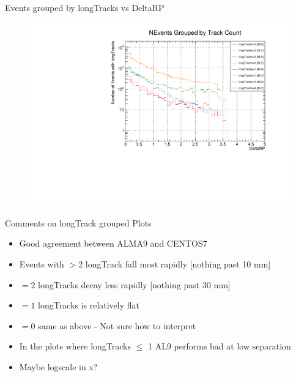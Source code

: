 \begin{frame}{Events grouped by longTracks vs DeltaRP}
    \begin{figure}
        \includegraphics[width=\linewidth]{./output/DeltaRP_all.pdf}
    \end{figure}
\end{frame}

\begin{frame}{Comments on longTrack grouped Plots}
    \begin{itemize}
        \item Good agreement between ALMA9 and CENTOS7
        \item Events with $>2$ longTrack fall most rapidly [nothing past 10 mm]
        \item $=2$ longTracks decay less rapidly [nothing past 30 mm]
        \item $=1$ longTracks is relatively flat
        \item $=0$ same as above - Not sure how to interpret
        \item In the plots where longTracks $\leq$ 1 AL9 performs bad at low separation 
        \item Maybe logscale in x?
    \end{itemize}
    
\end{frame}